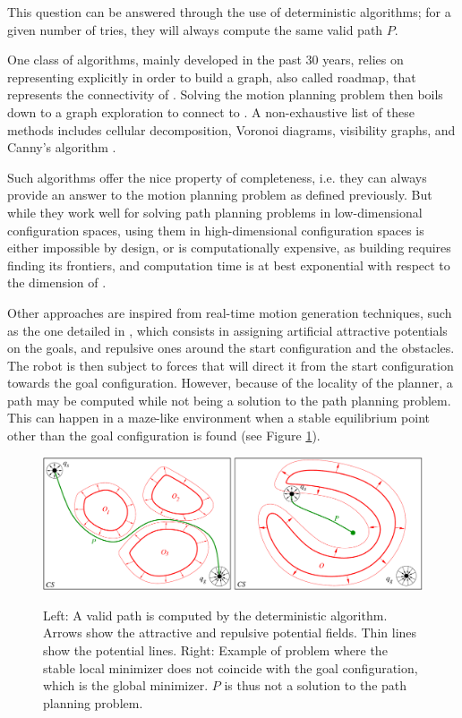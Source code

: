 This question can be answered through the use of deterministic
algorithms; for a given number of tries, they will always compute the
same valid path $P$.

One class of algorithms, mainly developed in the past 30 years, relies
on representing {\cobs} explicitly in order to build a graph, also
called roadmap, that represents the connectivity of {\cfree}. Solving
the motion planning problem then boils down to a graph exploration to
connect  to . A non-exhaustive list of these
methods includes cellular decomposition, Voronoi diagrams, visibility
graphs, and Canny's algorithm \cite{good04}.

Such algorithms offer the nice property of completeness, i.e. they can
always provide an answer to the motion planning problem as defined
previously. But while they work well for solving path planning
problems in low-dimensional configuration spaces, using them in
high-dimensional configuration spaces is either impossible by design,
or is computationally expensive, as building {\cfree} requires finding
its frontiers, and computation time is at best exponential with
respect to the dimension of {\cspace}.

Other approaches are inspired from real-time motion generation
techniques, such as the one detailed in \cite{khat85}, which consists
in assigning artificial attractive potentials on the goals, and
repulsive ones around the start configuration and the obstacles. The
robot is then subject to forces that will direct it from the start
configuration towards the goal configuration. However, because of the
locality of the planner, a path may be computed while not being a
solution to the path planning problem. This can happen in a maze-like
environment when a stable equilibrium point other than the goal
configuration is found (see Figure
\ref{fig:chap1-deterministic-algorithm}).

\begin{figure}
  \centering
      {\includegraphics[width = \linewidth]
        {src/chap1-path-optimization/deterministic-algorithm.pdf}}
      \caption{Left: A valid path is computed by the deterministic
        algorithm. Arrows show the attractive and repulsive potential
        fields. Thin lines show the potential lines. Right: Example of
        problem where the stable local minimizer does not coincide
        with the goal configuration, which is the global
        minimizer. $P$ is thus not a solution to the path planning
        problem.}
      \label{fig:chap1-deterministic-algorithm}
\end{figure}


